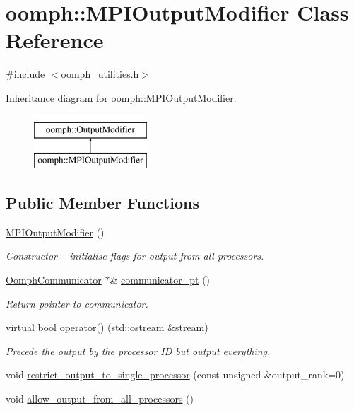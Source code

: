 \hypertarget{classoomph_1_1MPIOutputModifier}{}\section{oomph\+:\+:M\+P\+I\+Output\+Modifier Class Reference}
\label{classoomph_1_1MPIOutputModifier}


{\ttfamily \#include $<$oomph\+\_\+utilities.\+h$>$}

Inheritance diagram for oomph\+:\+:M\+P\+I\+Output\+Modifier\+:\begin{figure}[H]
\begin{center}
\leavevmode
\includegraphics[height=2.000000cm]{classoomph_1_1MPIOutputModifier}
\end{center}
\end{figure}
\subsection*{Public Member Functions}
\begin{DoxyCompactItemize}
\item 
\hyperlink{classoomph_1_1MPIOutputModifier_a3f9c2bd12d8f68daa52c7eb3e5d0ac00}{M\+P\+I\+Output\+Modifier} ()
\begin{DoxyCompactList}\small\item\em Constructor -- initialise flags for output from all processors. \end{DoxyCompactList}\item 
\hyperlink{classoomph_1_1OomphCommunicator}{Oomph\+Communicator} $\ast$\& \hyperlink{classoomph_1_1MPIOutputModifier_a202e3f2782ae00192349a3969c3c38d2}{communicator\+\_\+pt} ()
\begin{DoxyCompactList}\small\item\em Return pointer to communicator. \end{DoxyCompactList}\item 
virtual bool \hyperlink{classoomph_1_1MPIOutputModifier_a982af85269a497f384cdff7baf9487a1}{operator()} (std\+::ostream \&stream)
\begin{DoxyCompactList}\small\item\em Precede the output by the processor ID but output everything. \end{DoxyCompactList}\item 
void \hyperlink{classoomph_1_1MPIOutputModifier_a5822d5ea7cd02753e5706ec790f2ff6e}{restrict\+\_\+output\+\_\+to\+\_\+single\+\_\+processor} (const unsigned \&output\+\_\+rank=0)
\item 
void \hyperlink{classoomph_1_1MPIOutputModifier_af4b8be91b5f6eb8be549f2926047aa14}{allow\+\_\+output\+\_\+from\+\_\+all\+\_\+processors} ()
\end{DoxyCompactItemize}
